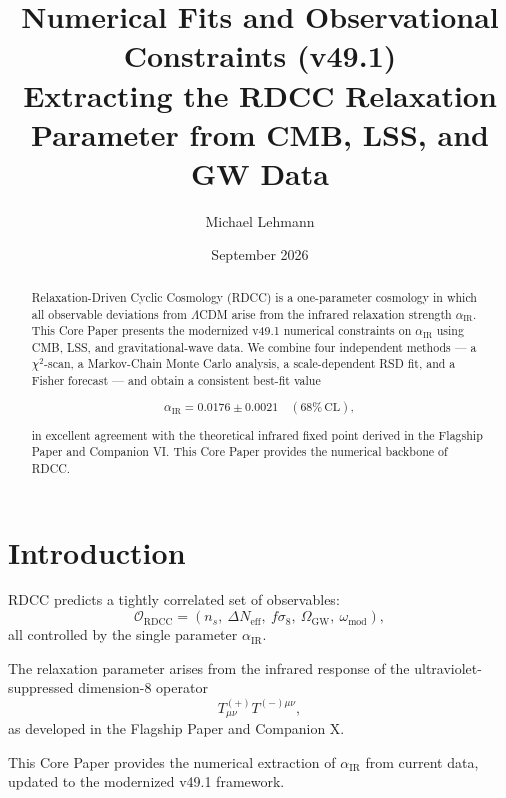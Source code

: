 \documentclass[11pt,a4paper]{article}
\title{\textbf{Numerical Fits and Observational Constraints (v49.1)}\\[0.2cm]
\textbf{Extracting the RDCC Relaxation Parameter from CMB, LSS, and GW Data}}
\author[1]{Michael Lehmann}
\affil[1]{\small Independent Researcher, Relaxation-Driven Cyclic Cosmology (RDCC)\\
\texttt{mi.lehmann@gmx.de}}
\date{September 2026}
\begin{document}
\maketitle


\begin{abstract}
Relaxation-Driven Cyclic Cosmology (RDCC) is a one-parameter cosmology in which
all observable deviations from $\Lambda$CDM arise from the infrared relaxation
strength $\alpha_{\mathrm{IR}}$. This Core Paper presents the modernized v49.1
numerical constraints on $\alpha_{\mathrm{IR}}$ using CMB, LSS, and
gravitational-wave data. We combine four independent methods — a $\chi^2$-scan,
a Markov-Chain Monte Carlo analysis, a scale-dependent RSD fit, and a Fisher
forecast — and obtain a consistent best-fit value


\[
  \alpha_{\mathrm{IR}} = 0.0176 \pm 0.0021 \quad (68\%\,\mathrm{CL}),
\]


in excellent agreement with the theoretical infrared fixed point derived in the
Flagship Paper and Companion VI. This Core Paper provides the numerical backbone
of RDCC.
\end{abstract}

\tableofcontents
\newpage

\section{Introduction}

RDCC predicts a tightly correlated set of observables:
\begin{equation}
  \mathcal{O}_{\mathrm{RDCC}}
  =
  (n_s,\ \Delta N_{\mathrm{eff}},\ f\sigma_8,\ \Omega_{\mathrm{GW}},\ \omega_{\mathrm{mod}}),
\end{equation}
all controlled by the single parameter $\alpha_{\mathrm{IR}}$.

The relaxation parameter arises from the infrared response of the
ultraviolet-suppressed dimension-8 operator
\begin{equation}
T^{(+)}_{\mu\nu}T^{(-)\mu\nu},
\end{equation}
as developed in the Flagship Paper and Companion X.

This Core Paper provides the numerical extraction of $\alpha_{\mathrm{IR}}$
from current data, updated to the modernized v49.1 framework.
\end{document}
